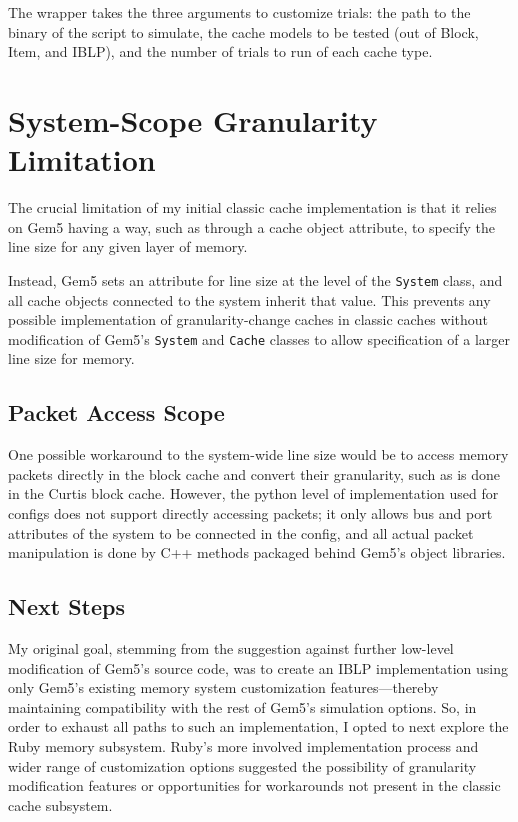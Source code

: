 \documentclass[12pt,twoside]{reedthesis}
\begin{document}
	The wrapper takes the three arguments to customize trials: the path to the binary of the script to simulate, the cache models to be tested (out of Block, Item, and IBLP), and the number of trials to run of each cache type.

\section{System-Scope Granularity Limitation}

	The crucial limitation of my initial classic cache implementation is that it relies on Gem5 having a way, such as through a cache object attribute, to specify the line size for any given layer of memory.

	Instead, Gem5 sets an attribute for line size at the level of the \verb`System` class, and all cache objects connected to the system inherit that value. This prevents any possible implementation of granularity-change caches in classic caches without modification of Gem5's \verb`System` and \verb`Cache` classes to allow specification of a larger line size for memory.

	\subsection*{Packet Access Scope}

	One possible workaround to the system-wide line size would be to access memory packets directly in the block cache and convert their granularity, such as is done in the Curtis block cache. However, the python level of implementation used for configs does not support directly accessing packets; it only allows bus and port attributes of the system to be connected in the config, and all actual packet manipulation is done by C++ methods packaged behind Gem5's object libraries.

	\subsection*{Next Steps}

	My original goal, stemming from the suggestion against further low-level modification of Gem5's source code, was to create an IBLP implementation using only Gem5's existing memory system customization features---thereby maintaining compatibility with the rest of Gem5's simulation options. So, in order to exhaust all paths to such an implementation, I opted to next explore the Ruby memory subsystem. Ruby's more involved implementation process and wider range of customization options suggested the possibility of granularity modification features or opportunities for workarounds not present in the classic cache subsystem.
\end{document}

